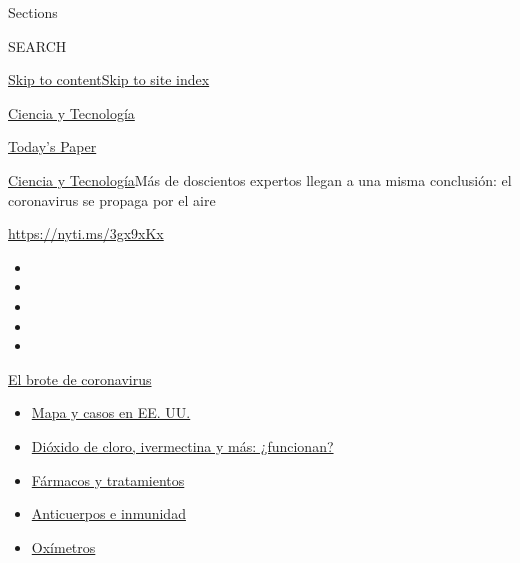 Sections

SEARCH

\protect\hyperlink{site-content}{Skip to
content}\protect\hyperlink{site-index}{Skip to site index}

\href{https://www.nytimes.com/es/section/ciencia-y-tecnologia}{Ciencia y
Tecnología}

\href{https://myaccount.nytimes.com/auth/login?response_type=cookie\&client_id=vi}{}

\href{https://www.nytimes.com/section/todayspaper}{Today's Paper}

\href{/es/section/ciencia-y-tecnologia}{Ciencia y
Tecnología}\textbar{}Más de doscientos expertos llegan a una misma
conclusión: el coronavirus se propaga por el aire

\url{https://nyti.ms/3gx9xKx}

\begin{itemize}
\item
\item
\item
\item
\item
\end{itemize}

\href{https://www.nytimes.com/es/spotlight/coronavirus?action=click\&pgtype=Article\&state=default\&region=TOP_BANNER\&context=storylines_menu}{El
brote de coronavirus}

\begin{itemize}
\tightlist
\item
  \href{https://www.nytimes.com/es/interactive/2020/espanol/mundo/coronavirus-en-estados-unidos.html?action=click\&pgtype=Article\&state=default\&region=TOP_BANNER\&context=storylines_menu}{Mapa
  y casos en EE. UU.}
\item
  \href{https://www.nytimes.com/es/2020/07/23/espanol/america-latina/bolivia-cloro-coronavirus-ivermectina.html?action=click\&pgtype=Article\&state=default\&region=TOP_BANNER\&context=storylines_menu}{Dióxido
  de cloro, ivermectina y más: ¿funcionan?}
\item
  \href{https://www.nytimes.com/es/interactive/2020/science/coronavirus-tratamientos-curas.html?action=click\&pgtype=Article\&state=default\&region=TOP_BANNER\&context=storylines_menu}{Fármacos
  y tratamientos}
\item
  \href{https://www.nytimes.com/es/2020/07/28/espanol/ciencia-y-tecnologia/anticuerpos-coronavirus-inmunidad.html?action=click\&pgtype=Article\&state=default\&region=TOP_BANNER\&context=storylines_menu}{Anticuerpos
  e inmunidad}
\item
  \href{https://www.nytimes.com/es/2020/04/29/espanol/estilos-de-vida/oximetro-para-que-sirve.html?action=click\&pgtype=Article\&state=default\&region=TOP_BANNER\&context=storylines_menu}{Oxímetros}
\end{itemize}

